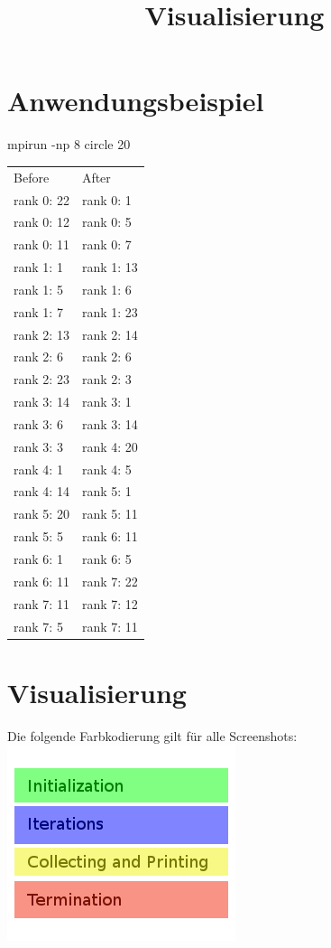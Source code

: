 \documentclass[fleqn]{article}
\title{Visualisierung}
\begin{document}
\section{Anwendungsbeispiel}
\begin{center}
mpirun -np 8 circle 20\\
\begin{tabular}{|l|l|}            \hline\hline
Before & After\\
rank 0: 22 & rank 0: 1\\ 
rank 0: 12 & rank 0: 5\\
rank 0: 11 & rank 0: 7\\
rank 1: 1 & rank 1: 13\\
rank 1: 5 & rank 1: 6\\
rank 1: 7 & rank 1: 23\\
rank 2: 13 & rank 2: 14\\
rank 2: 6 & rank 2: 6\\
rank 2: 23 & rank 2: 3\\
rank 3: 14 & rank 3: 1\\
rank 3: 6 & rank 3: 14\\
rank 3: 3 & rank 4: 20\\
rank 4: 1 & rank 4: 5\\
rank 4: 14 & rank 5: 1\\
rank 5: 20 & rank 5: 11\\
rank 5: 5 & rank 6: 11\\
rank 6: 1 & rank 6: 5\\
rank 6: 11 & rank 7: 22\\
rank 7: 11 & rank 7: 12\\
rank 7: 5 & rank 7: 11\\
\hline
\end{tabular}
\end{center}
\section{Visualisierung}
Die folgende Farbkodierung gilt für alle Screenshots:\\
\includegraphics[scale=0.4]{caption}
\end{document}
